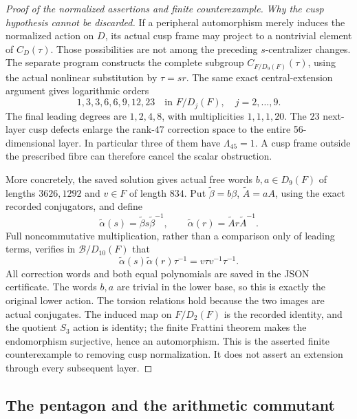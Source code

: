 \begin{proof}[Proof of the normalized assertions and finite counterexample]
\emph{Why the cusp hypothesis cannot be discarded.}
If a peripheral automorphism merely induces the
normalized action on \(D\), its actual cusp frame
may project to a nontrivial element of \(C_D(\tau)\).
Those possibilities are not among the preceding
\(s\)-centralizer changes.
The separate program 
constructs the complete subgroup
\(C_{F/D_9(F)}(\tau)\), using the actual nonlinear
substitution by \(\tau=sr\). The same exact
central-extension argument gives logarithmic orders
\[
 1,3,3,6,6,9,12,23
 \quad\text{in }F/D_j(F),\quad j=2,\ldots,9.
 \tag{C.12g}
\]
The final leading degrees are \(1,2,4,8\), with
multiplicities \(1,1,1,20\).
The \(23\) next-layer cusp defects enlarge the
rank-\(47\) correction space to the entire
56-dimensional layer. In particular three of
them have \(\Lambda_{45}=1\).
A cusp frame outside the prescribed fibre can
therefore cancel the scalar obstruction.

More concretely, the saved solution gives actual
free words \(b,a\in D_9(F)\) of lengths \(3626,1292\)
and \(v\in F\) of length \(834\). Put
\(\widetilde\beta=b\beta\),
\(\widetilde A=aA\), using the exact recorded
conjugators, and define
\[
 \widetilde\alpha(s)=\widetilde\beta s\widetilde\beta^{-1},
 \qquad
 \widetilde\alpha(r)=\widetilde A r\widetilde A^{-1}.
 \tag{C.12h}
\]
Full noncommutative multiplication, rather than a
comparison only of leading terms, verifies in
\(\mathcal B/D_{10}(F)\) that
\[
 \widetilde\alpha(s)\widetilde\alpha(r)\tau^{-1}
        =v\tau v^{-1}\tau^{-1}.
 \tag{C.12i}
\]
All correction words and both equal polynomials
are saved in the JSON certificate. The words
\(b,a\) are trivial in the lower base, so this
is exactly the original lower action.
The torsion relations hold because the two
images are actual conjugates. The induced map
on \(F/D_2(F)\) is the recorded identity, and
the quotient \(S_3\) action is identity; the
finite Frattini theorem makes the endomorphism
surjective, hence an automorphism.
This is the asserted finite counterexample to
removing cusp normalization. It does not assert
an extension through every subsequent layer.
\end{proof}

\subsection{The pentagon and the arithmetic commutant}

